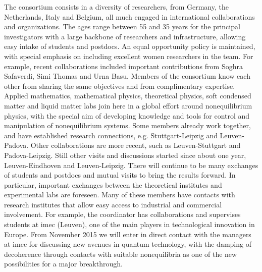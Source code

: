 The consortium consists in a diversity of researchers, from Germany, the
Netherlands, Italy and Belgium, all much engaged in international collaborations and
organizations.
%
The ages range between 55 and 35 years for the principal investigators with a large backbone
of researchers and infrastructure, allowing easy intake of students and postdocs. An equal
opportunity policy is maintained, with special emphasis on including excellent women
researchers in the team. For example, recent collaborations included important contributions from Soghra Safaverdi, Simi Thomas and Urna Basu.  Members of the
consortium know each other from sharing the same objectives and from complimentary
expertise.
%
Applied mathematics, mathematical physics, theoretical physics, soft condensed matter and
liquid matter labs join here in a global effort around nonequilibrium physics, with the
special aim of developing knowledge and tools for control and manipulation of nonequilibrium
systems. Some members already work together, and have established research connections,
e.g. Stuttgart-Leipzig and Leuven-Padova.  Other collaborations are more
recent, such as Leuven-Stuttgart and Padova-Leipzig.  Still other visits and discussions
started since about one year, Leuven-Eindhoven and Leuven-Leipzig.
%
There will continue to be many exchanges of students and postdocs and mutual visits to bring
the results forward.  In particular, important exchanges between the theoretical institutes
and experimental labs are foreseen.  Many of these members have contacts with research
institutes that allow easy access to industrial and commercial involvement.  For example,
the coordinator has collaborations and supervises students at imec (Leuven), one of the main
players in technological innovation in Europe. From November 2015 we will enter in direct
contact with the managers at imec for discussing new avenues in quantum technology, with the
damping of decoherence through contacts with suitable nonequilibria as one of the new possibilities for a major breakthrough.


